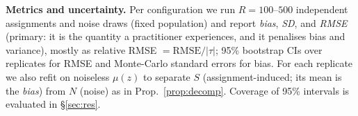 \textbf{Metrics and uncertainty.} Per configuration we run $R{=}100$--$500$ independent assignments and noise draws (fixed population) and report \emph{bias}, \emph{SD}, and \emph{RMSE} (primary: it is the quantity a practitioner experiences, and it penalises bias and variance), mostly as relative RMSE $=\mathrm{RMSE}/|\tau|$; 95\% bootstrap CIs over replicates for RMSE and Monte-Carlo standard errors for bias. For each replicate we also refit on noiseless $\mu(z)$ to separate $S$ (assignment-induced; its mean is the \emph{bias}) from $N$ (noise) as in Prop.~\ref{prop:decomp}. Coverage of 95\% intervals is evaluated in \S\ref{sec:res}.
